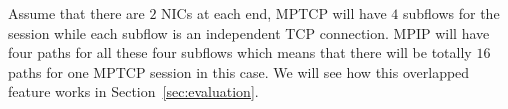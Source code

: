 Assume that there are $2$ NICs at each end, MPTCP will have $4$ subflows for the session while each subflow is an independent TCP connection. MPIP will have four paths for all these four subflows which means that there will be totally $16$ paths for one MPTCP session in this case. We will see how this overlapped feature works in Section~\ref{sec:evaluation}.